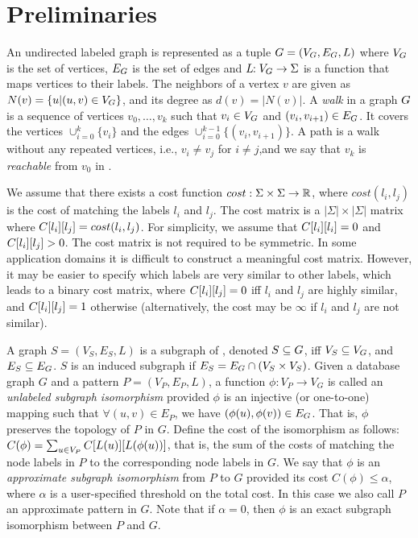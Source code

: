 \section{Preliminaries}

An undirected labeled graph \db is represented as a tuple $ G =
(V_G,E_G,L) $ where $V_G$ is the set of vertices, $E_G$ is the set of
edges and $L\!\!: V_G \rightarrow \Sigma $ is a function that maps
vertices to their labels.  The neighbors of a vertex $v$ are given as $
N(v) = \{ u | (u,v) \in V_G \} $, and its degree as $d(v) = |N(v)|$.  A
{\em walk} in a graph $G$ is a sequence of vertices $v_0,\ldots,v_k$
such that $v_i \in V_G$ and $(v_i,v_{i+1}) \in E_G$. It covers the
vertices $\cup_{i=0}^{k} \{v_i\}$ and the edges $\cup_{i=0}^{k-1}
\{(v_i,v_{i+1})\}$.  A path is a walk without any repeated vertices,
i.e., $v_i \ne v_j$ for $i \ne j$,and we say that $v_{k}$ is 
{\em reachable} from $v_0$ in \khops.

\smallskip{}
We assume that there exists a cost function $cost: \Sigma \times \Sigma
\to {\mathord{\mathbb R}}$, where $cost(l_i,l_j)$ is the cost of matching the labels
$l_i$ and $l_j$. The cost matrix  is a $|\Sigma| \times |\Sigma|$
matrix where ${C}[l_i][l_j] = cost(l_i,l_j)$. For simplicity, we
assume that ${C}[l_i][l_i] = 0 $ and ${C}[l_i][l_j] > 0$.
The cost matrix is not required to be symmetric. 
In some application domains it is difficult to construct a meaningful cost
matrix.  However, it may be easier to specify which labels are very
similar to other labels, which leads to a binary cost matrix, where 
${C}[l_i][l_j] = 0$ iff $l_i$ and $l_j$ are highly similar, and 
${C}[l_i][l_j] = 1$ otherwise (alternatively, the cost may be
$\infty$ if $l_i$ and $l_j$ are not similar). 

\smallskip{}
A graph $S = (V_S,E_S,L)$ is a subgraph of \db, denoted $S \subseteq
G$, iff $V_S \subseteq V_G$, and $E_S \subseteq E_G$.  $S$ is an
induced subgraph if $E_S = E_G \cap (V_S \times V_S)$.  Given a database
graph $G$ and a pattern $P = (V_P,E_P,L)$, a function $\phi\!\!: V_P \to
V_G$ is called an {\em unlabeled subgraph isomorphism} provided $\phi$
is an injective (or one-to-one) mapping such that $\forall (u,v) \in
E_P$, we have $(\phi(u),\phi(v)) \in E_G$. That is, $\phi$ preserves the
topology of $P$ in $G$. Define the cost of the isomorphism as follows:
$C(\phi) = \sum_{u \in V_P} {C}[L(u)][L(\phi(u))]$, that is, the
sum of the costs of matching the node labels in $P$ to the corresponding
node labels in $G$.  We say that $\phi$ is an {\em approximate subgraph
isomorphism} from $P$ to $G$ provided its cost $C(\phi) \le \alpha$,
where $\alpha$ is a user-specified threshold on the total cost. In this
case we also call $P$ an approximate pattern in $G$. Note
that if $\alpha = 0$, then $\phi$ is an exact subgraph isomorphism
between $P$ and $G$.



